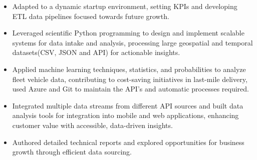 \documentclass[10pt,a4paper,ragged2e,withhyper]{altacv}
\begin{document}
\begin{paracol}{2}


\begin{itemize}
    \item Adapted to a dynamic startup environment, setting KPIs and developing ETL data pipelines focused towards future growth.
    \item Leveraged scientific Python programming to design and implement scalable systems for data intake and analysis, processing large geospatial and temporal datasets(CSV, JSON and API) for actionable insights.
    \item Applied machine learning techniques, statistics, and probabilities to analyze fleet vehicle data, contributing to cost-saving initiatives in last-mile delivery, used Azure and Git to maintain the API's and automatic processes required.
    \item Integrated multiple data streams from different API sources and built data analysis tools for integration into mobile and web applications, enhancing customer value with accessible, data-driven insights.
    \item Authored detailed technical reports and explored opportunities for business growth through efficient data sourcing.
\end{itemize}


\end{paracol}
\end{document}

